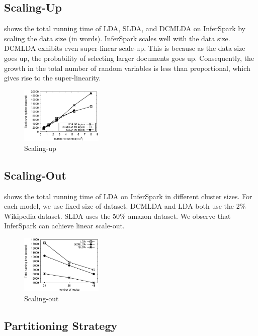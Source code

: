 \subsection{Scaling-Up}

 shows the total running time of LDA, SLDA, and DCMLDA on InferSpark
by scaling the data size (in words).
InferSpark scales well with the data size.
DCMLDA exhibits even super-linear scale-up. This is because as the data size goes up, 
the probability of selecting larger documents goes up. Consequently,
the growth in the total number of random variables is less than proportional, which gives rise
to the super-linearity.

\begin{figure}[h]\centering
	\includegraphics[width=0.35\textwidth]{figs/exp_lda_datasize.eps}
	\caption{Scaling-up}
	\label{fig:scale-up}
\end{figure}



\subsection{Scaling-Out}

 shows the total running time of LDA on InferSpark in
different cluster sizes. For each model, we use fixed size of dataset.  DCMLDA
and LDA both use the 2\% Wikipedia dataset. SLDA uses the 50\% amazon dataset.
We observe that InferSpark can achieve linear scale-out. 

\begin{figure}[h]
	\centering
	\includegraphics[width=0.35\textwidth]{figs/exp_clustersize.eps}
	\caption{Scaling-out}
	\label{fig:scale-out}
\end{figure}


\subsection{Partitioning Strategy}

